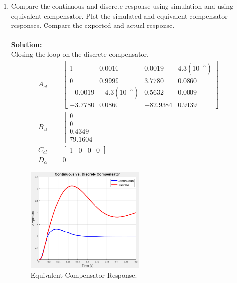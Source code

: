 \documentclass[11pt]{article}
\newcommand{\solution}{\textbf{Solution: \\}}
\begin{document}
\begin{enumerate}[label=\textbf{\arabic*.}]
  \vspace{24pt}
  \item Compare the continuous and discrete response using simulation and using 
  equivalent compensator. Plot the simulated and equivalent compensator responses. 
  Compare the expected and actual response. \\ \\ 
  \solution
  Closing the loop on the discrete compensator.
  \begin{equation}
    \begin{split}
      A_{cl} &=
      \begin{bmatrix}
        1 & 0.0010 & 0.0019 & 4.3(10^{-5}) \\ 
        0 & 0.9999 & 3.7780 & 0.0860 \\ 
        -0.0019 & -4.3(10^{-5}) & 0.5632 & 0.0009 \\
        -3.7780 & 0.0860 & -82.9384 & 0.9139
      \end{bmatrix} \\
      B_{cl} &=
      \begin{bmatrix}
        0 \\ 0 \\ 0.4349 \\ 79.1604
      \end{bmatrix} \\
      C_{cl} &=
      \begin{bmatrix}
        1 & 0 & 0 & 0
      \end{bmatrix} \\
      D_{cl} &= 0
    \end{split}
  \end{equation}

  \begin{figure}[H]
    \centering
    \includegraphics[width=0.55\textwidth]{p6.png}
    \caption{Equivalent Compensator Response.}
  \end{figure}

\end{enumerate}
\end{document}
